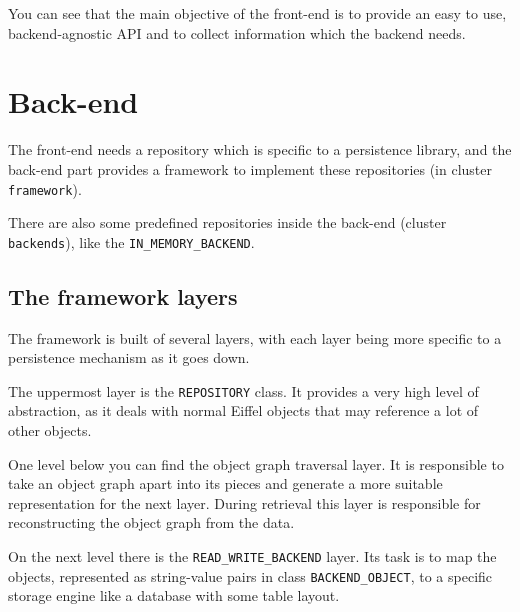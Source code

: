 \documentclass[a4paper,12pt]{report}
\begin{document}
You can see that the main objective of the front-end is to provide an easy to use, backend-agnostic API and to collect information which the backend needs.

% 


\section{Back-end}

The front-end needs a repository which is specific to a persistence library, and the back-end part provides a framework to implement these repositories (in cluster \lstinline!framework!).

There are also some predefined repositories inside the back-end (cluster \lstinline!backends!), like the \lstinline!IN_MEMORY_BACKEND!.

\subsection{The framework layers}

The framework is built of several layers, with each layer being more specific to a persistence mechanism as it goes down.

The uppermost layer is the \lstinline!REPOSITORY! class. 
It provides a very high level of abstraction, as it deals with normal Eiffel objects that may reference a lot of other objects.

One level below you can find the object graph traversal layer.
It is responsible to take an object graph apart into its pieces and generate a more suitable representation for the next layer.
During retrieval this layer is responsible for reconstructing the object graph from the data.

On the next level there is the \lstinline!READ_WRITE_BACKEND! layer.
Its task is to map the objects, represented as string-value pairs in class \lstinline!BACKEND_OBJECT!, 
to a specific storage engine like a database with some table layout.
\end{document}
